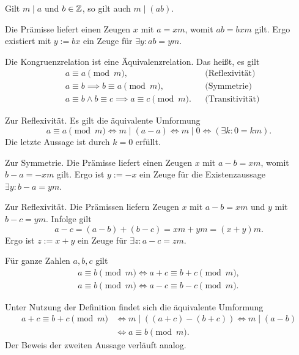 \begin{Korollar}\label{divides-weaken}
Gilt $m\mid a$ und $b\in\mathbb Z$, so gilt auch $m\mid (ab)$.
\end{Korollar}
\begin{Beweis}
Die Prämisse liefert einen Zeugen $x$ mit $a=xm$, womit $ab=bxm$
gilt. Ergo existiert mit $y:=bx$ ein Zeuge für
$\exists y\colon ab=ym$.\,\qedsymbol
\end{Beweis}

\begin{Korollar}
Die Kongruenzrelation ist eine Äquivalenzrelation. Das heißt, es gilt
\begin{align*}
& a\equiv a\pmod m, && \text{(Reflexivität)}\\
& a\equiv b \implies b\equiv a\pmod m, && \text{(Symmetrie)}\\
& a\equiv b\land b\equiv c\implies a\equiv c\pmod m. && \text{(Transitivität)}
\end{align*}
\end{Korollar}
\begin{Beweis}
Zur Reflexivität. Es gilt die äquivalente Umformung
\[a\equiv a\pmod m \iff m\mid (a-a) \iff m\mid 0\iff (\exists k\colon 0 = km).\]
Die letzte Aussage ist durch $k=0$ erfüllt.

Zur Symmetrie. Die Prämisse liefert einen Zeugen $x$ mit $a-b = xm$,
womit $b-a = -xm$ gilt. Ergo ist $y:=-x$ ein Zeuge für die
Existenzaussage $\exists y\colon b-a = ym$.

Zur Reflexivität. Die Prämissen liefern Zeugen $x$ mit $a-b=xm$
und $y$ mit $b-c=ym$. Infolge gilt
\[a-c = (a-b) + (b-c) = xm + ym = (x+y)m.\]
Ergo ist $z:=x+y$ ein Zeuge für $\exists z\colon a-c = zm$.\,\qedsymbol
\end{Beweis}

\begin{Korollar}\label{cong-shift}
Für ganze Zahlen $a,b,c$ gilt
\begin{gather*}
a\equiv b\pmod m \iff a+c\equiv b+c \pmod m,\\
a\equiv b\pmod m \iff a-c\equiv b-c \pmod m.
\end{gather*}
\end{Korollar}
\begin{Beweis}
Unter Nutzung der Definition findet sich die äquivalente Umformung
\begin{align*}
a+c\equiv b+c\pmod m &\iff m\mid ((a+c)-(b+c))
\iff m\mid (a-b)\\
&\iff a\equiv b\pmod m.
\end{align*}
Der Beweis der zweiten Aussage verläuft analog.\,\qedsymbol
\end{Beweis}

